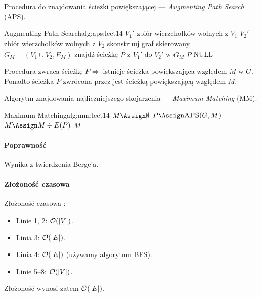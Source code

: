 Procedura do znajdowania ścieżki powiększającej --- \textit{Augmenting Path Search} (APS).

\begin{alg}{Augmenting Path Search}{alg:aps:lect14}
	 
	\State $V_1'$ \Assign zbiór wierzchołków wolnych z $V_1$
	\State $V_2'$ \Assign zbiór wierzchołków wolnych z $V_2$
	\State skonstruuj graf skierowany $G_M = (V_1 \cup V_2, E_M)$
	\State znajdź ścieżkę $\vec{P}$ z $V_1'$ do $V_2'$ w $G_M$
	\State \Return $P$ 
	\Else
	\State \Return NULL
	\EndIf
	\EndFunction
\end{alg}

\begin{lemma}
	Procedura \textnormal{} zwraca ścieżkę $P \iff$ istnieje ścieżka powiększająca względem $M$ w $G$. Ponadto ścieżka $P$ zwrócona przez \textnormal{} jest ścieżką powiększającą względem $M$.
\end{lemma}

Algorytm znajdowania najliczniejszego skojarzenia --- \textit{Maximum Matching} (MM).

\begin{alg}{Maximum Matching}{alg:mm:lect14}
	 
	\State $M \Assign \emptyset$
	\Repeat
	\State $P \Assign \Call{APS}{G, M}$
	\State $M \Assign M \div E(P)$
	\EndIf
	\State \Return $M$
	\EndFunction
\end{alg}

\paragraph{Poprawność} Wynika z twierdzenia Berge'a.

\paragraph{Złożoność czasowa}

Złożoność czasowa \textnormal{}:
\begin{itemize}[nosep]
	\item Linie 1, 2: $\mathcal{O}(|V|)$.
	\item Linia 3: $\mathcal{O}(|E|)$.
	\item Linia 4: $\mathcal{O}(|E|)$ (używamy algorytmu BFS).
	\item Linie 5--8: $\mathcal{O}(|V|)$.
\end{itemize}
Złożoność \textnormal{} wynosi zatem $\mathcal{O}(|E|)$.

